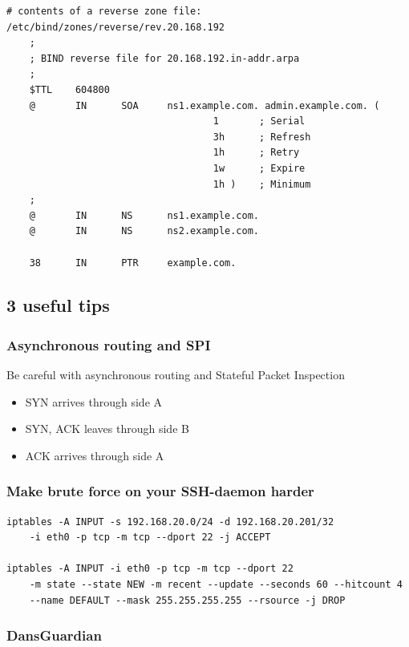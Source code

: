 \documentclass{article}
\begin{document}
\begin{verbatim}
# contents of a reverse zone file:
/etc/bind/zones/reverse/rev.20.168.192
    ;
    ; BIND reverse file for 20.168.192.in-addr.arpa
    ;
    $TTL    604800
    @       IN      SOA     ns1.example.com. admin.example.com. (
                                    1       ; Serial
                                    3h      ; Refresh
                                    1h      ; Retry
                                    1w      ; Expire
                                    1h )    ; Minimum
    ;
    @       IN      NS      ns1.example.com.
    @       IN      NS      ns2.example.com.

    38      IN      PTR     example.com.
\end{verbatim}


\subsection{3 useful tips}

\subsubsection{Asynchronous routing and SPI}

Be careful with asynchronous routing and Stateful Packet Inspection

\begin{itemize}
    \item SYN arrives through side A
    \item SYN, ACK leaves through side B
    \item ACK arrives through side A
\end{itemize}

\subsubsection{Make brute force on your SSH-daemon harder}

\begin{verbatim}
iptables -A INPUT -s 192.168.20.0/24 -d 192.168.20.201/32 
    -i eth0 -p tcp -m tcp --dport 22 -j ACCEPT

iptables -A INPUT -i eth0 -p tcp -m tcp --dport 22 
    -m state --state NEW -m recent --update --seconds 60 --hitcount 4 
    --name DEFAULT --mask 255.255.255.255 --rsource -j DROP
\end{verbatim}

\subsubsection{DansGuardian}
\end{document}
